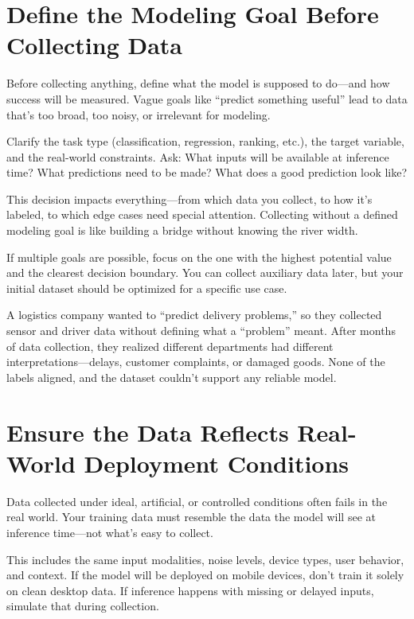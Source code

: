 \documentclass[12pt,openany]{book}
\begin{document}
\section{Define the Modeling Goal Before Collecting Data}

Before collecting anything, define what the model is supposed to do—and how success will be measured. Vague goals like “predict something useful” lead to data that's too broad, too noisy, or irrelevant for modeling.
\newline

Clarify the task type (classification, regression, ranking, etc.), the target variable, and the real-world constraints. Ask: What inputs will be available at inference time? What predictions need to be made? What does a good prediction look like?
\newline

This decision impacts everything—from which data you collect, to how it’s labeled, to which edge cases need special attention. Collecting without a defined modeling goal is like building a bridge without knowing the river width.
\newline

If multiple goals are possible, focus on the one with the highest potential value and the clearest decision boundary. You can collect auxiliary data later, but your initial dataset should be optimized for a specific use case.

\begin{examplebox}
A logistics company wanted to “predict delivery problems,” so they collected sensor and driver data without defining what a “problem” meant. After months of data collection, they realized different departments had different interpretations—delays, customer complaints, or damaged goods. None of the labels aligned, and the dataset couldn’t support any reliable model.
\end{examplebox}



\section{Ensure the Data Reflects Real-World Deployment Conditions}

Data collected under ideal, artificial, or controlled conditions often fails in the real world. Your training data must resemble the data the model will see at inference time—not what’s easy to collect.

This includes the same input modalities, noise levels, device types, user behavior, and context. If the model will be deployed on mobile devices, don’t train it solely on clean desktop data. If inference happens with missing or delayed inputs, simulate that during collection.
\end{document}
